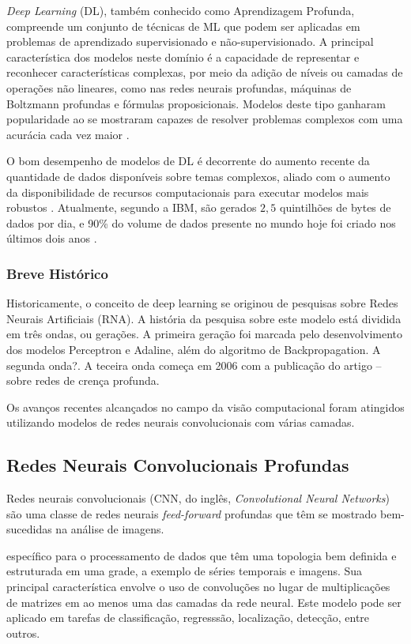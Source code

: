 \emph{Deep Learning} (DL), também conhecido como Aprendizagem Profunda, compreende um conjunto de técnicas de ML que podem ser aplicadas em problemas de aprendizado supervisionado e não-supervisionado. A principal característica dos modelos neste domínio é a capacidade de representar e reconhecer características complexas, por meio da adição de níveis ou camadas de operações não lineares, como nas redes neurais profundas, máquinas de Boltzmann profundas e fórmulas proposicionais. Modelos deste tipo ganharam popularidade ao se mostraram capazes de resolver problemas complexos com uma acurácia cada vez maior \cite{bengio2009learning}.

O bom desempenho de modelos de DL é decorrente do aumento recente da quantidade de dados disponíveis sobre temas complexos, aliado com o aumento da disponibilidade de recursos computacionais para executar modelos mais robustos \cite{goodfellow2016deep}. Atualmente, segundo a IBM, são gerados $2,5$ quintilhões de bytes de dados por dia, e 90\% do volume de dados presente no mundo hoje foi criado nos últimos dois anos \cite{ibm2017bigdata}.

\subsubsection{Breve Histórico}

Historicamente, o conceito de deep learning se originou de pesquisas sobre Redes Neurais Artificiais (RNA). A história da pesquisa sobre este modelo está dividida em três ondas, ou gerações. A primeira geração foi marcada pelo desenvolvimento dos modelos Perceptron e Adaline, além do algoritmo de Backpropagation. A segunda onda?. A teceira onda começa em 2006 com a publicação do artigo -- sobre redes de crença profunda.

Os avanços recentes alcançados no campo da visão computacional foram atingidos utilizando modelos de redes neurais convolucionais com várias camadas.


\subsection{Redes Neurais Convolucionais Profundas}
Redes neurais convolucionais (CNN, do inglês, \emph{Convolutional Neural Networks}) são uma classe de redes neurais \emph{feed-forward} profundas que têm se mostrado bem-sucedidas na análise de imagens.

específico para o processamento de dados que têm uma topologia bem definida e estruturada em uma grade, a exemplo de séries temporais e imagens. Sua principal característica envolve o uso de convoluções no lugar de multiplicações de matrizes em ao menos uma das camadas da rede neural\cite{goodfellow2016deep}. Este modelo pode ser aplicado em tarefas de classificação, regresssão, localização, detecção, entre outros.


